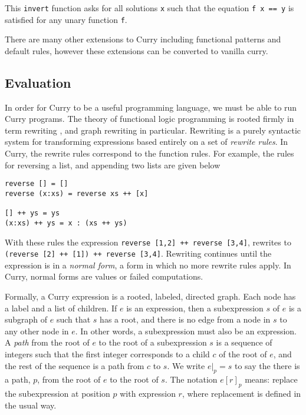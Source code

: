 This \texttt{invert} function asks for all solutions \texttt x
such that the equation \texttt{f x == y} is satisfied for any unary function \texttt f.

There are many other extensions to Curry including functional patterns and default rules, however
these extensions can be converted to vanilla curry.


\subsection{Evaluation}

In order for Curry to be a useful programming language, we must be able to run Curry programs.
The theory of functional logic programming is rooted firmly in term rewriting \cite{Klop92Handbook, Terese03}, 
and graph rewriting \cite{Plump99Handbook, EchahedJanodet97IMAG} in particular.
Rewriting is a purely syntactic system for transforming expressions based entirely on a set of \textit{rewrite rules}.
In Curry, the rewrite rules correspond to the function rules.
For example, the rules for reversing a list, and appending two lists are given below
\begin{verbatim}
reverse [] = []
reverse (x:xs) = reverse xs ++ [x]

[] ++ ys = ys
(x:xs) ++ ys = x : (xs ++ ys)
\end{verbatim}

With these rules the expression \texttt{reverse [1,2] ++ reverse [3,4]},
rewrites to \texttt{(reverse [2] ++ [1]) ++ reverse [3,4]}.
Rewriting continues until the expression is in a \textit{normal form}, a form in which no more rewrite rules apply.
In Curry, normal forms are values or failed computations.

Formally, a Curry expression is a rooted, labeled, directed graph.  Each node has a label and a list of children.
If $e$ is an expression, then a subexpression $s$ of $e$ is a subgraph of $e$ 
such that $s$ has a root, and there is no edge from a node in $s$ to any other node in $e$.
In other words, a subexpression must also be an expression.
A \textit{path} from the root of $e$ to the root of a subexpression $s$ is a sequence of integers such that
the first integer corresponds to a child $c$ of the root of $e$, and the rest of the sequence is a path from $c$ to $s$.
We write $e|_p = s$ to say the there is a path, $p$, from the root of $e$ to the root of $s$.
The notation $e[r]_p$ means: replace the subexpression at position $p$ with expression $r$,
where replacement is defined in the usual way.

